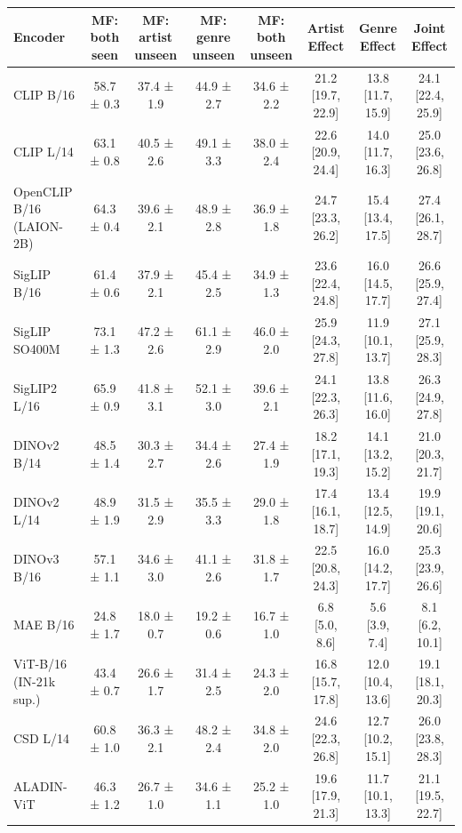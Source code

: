\begin{tabular}{lccccccc}
\toprule
Encoder & MF: both seen & MF: artist unseen & MF: genre unseen & MF: both unseen & Artist Effect & Genre Effect & Joint Effect \\
\midrule
CLIP B/16 & 58.7 ± 0.3 & 37.4 ± 1.9 & 44.9 ± 2.7 & 34.6 ± 2.2 & 21.2 [19.7, 22.9] & 13.8 [11.7, 15.9] & 24.1 [22.4, 25.9] \\
CLIP L/14 & 63.1 ± 0.8 & 40.5 ± 2.6 & 49.1 ± 3.3 & 38.0 ± 2.4 & 22.6 [20.9, 24.4] & 14.0 [11.7, 16.3] & 25.0 [23.6, 26.8] \\
OpenCLIP B/16 (LAION-2B) & 64.3 ± 0.4 & 39.6 ± 2.1 & 48.9 ± 2.8 & 36.9 ± 1.8 & 24.7 [23.3, 26.2] & 15.4 [13.4, 17.5] & 27.4 [26.1, 28.7] \\
SigLIP B/16 & 61.4 ± 0.6 & 37.9 ± 2.1 & 45.4 ± 2.5 & 34.9 ± 1.3 & 23.6 [22.4, 24.8] & 16.0 [14.5, 17.7] & 26.6 [25.9, 27.4] \\
SigLIP SO400M & 73.1 ± 1.3 & 47.2 ± 2.6 & 61.1 ± 2.9 & 46.0 ± 2.0 & 25.9 [24.3, 27.8] & 11.9 [10.1, 13.7] & 27.1 [25.9, 28.3] \\
SigLIP2 L/16 & 65.9 ± 0.9 & 41.8 ± 3.1 & 52.1 ± 3.0 & 39.6 ± 2.1 & 24.1 [22.3, 26.3] & 13.8 [11.6, 16.0] & 26.3 [24.9, 27.8] \\
DINOv2 B/14 & 48.5 ± 1.4 & 30.3 ± 2.7 & 34.4 ± 2.6 & 27.4 ± 1.9 & 18.2 [17.1, 19.3] & 14.1 [13.2, 15.2] & 21.0 [20.3, 21.7] \\
DINOv2 L/14 & 48.9 ± 1.9 & 31.5 ± 2.9 & 35.5 ± 3.3 & 29.0 ± 1.8 & 17.4 [16.1, 18.7] & 13.4 [12.5, 14.9] & 19.9 [19.1, 20.6] \\
DINOv3 B/16 & 57.1 ± 1.1 & 34.6 ± 3.0 & 41.1 ± 2.6 & 31.8 ± 1.7 & 22.5 [20.8, 24.3] & 16.0 [14.2, 17.7] & 25.3 [23.9, 26.6] \\
MAE B/16 & 24.8 ± 1.7 & 18.0 ± 0.7 & 19.2 ± 0.6 & 16.7 ± 1.0 & 6.8 [5.0, 8.6] & 5.6 [3.9, 7.4] & 8.1 [6.2, 10.1] \\
ViT-B/16 (IN-21k sup.) & 43.4 ± 0.7 & 26.6 ± 1.7 & 31.4 ± 2.5 & 24.3 ± 2.0 & 16.8 [15.7, 17.8] & 12.0 [10.4, 13.6] & 19.1 [18.1, 20.3] \\
CSD L/14 & 60.8 ± 1.0 & 36.3 ± 2.1 & 48.2 ± 2.4 & 34.8 ± 2.0 & 24.6 [22.3, 26.8] & 12.7 [10.2, 15.1] & 26.0 [23.8, 28.3] \\
ALADIN-ViT & 46.3 ± 1.2 & 26.7 ± 1.0 & 34.6 ± 1.1 & 25.2 ± 1.0 & 19.6 [17.9, 21.3] & 11.7 [10.1, 13.3] & 21.1 [19.5, 22.7] \\
\bottomrule
\end{tabular}
